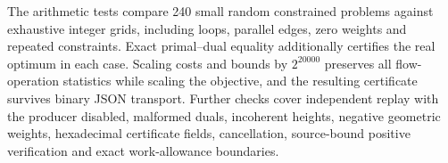 The arithmetic tests compare 240 small random constrained problems against
exhaustive integer grids, including loops, parallel edges, zero weights and
repeated constraints. Exact primal--dual equality additionally certifies the
real optimum in each case. Scaling costs and bounds by $2^{20000}$ preserves
all flow-operation statistics while scaling the objective, and the resulting
certificate survives binary JSON transport. Further checks cover independent
replay with the producer disabled, malformed duals, incoherent heights,
negative geometric weights, hexadecimal certificate fields, cancellation,
source-bound positive verification and exact work-allowance boundaries.


